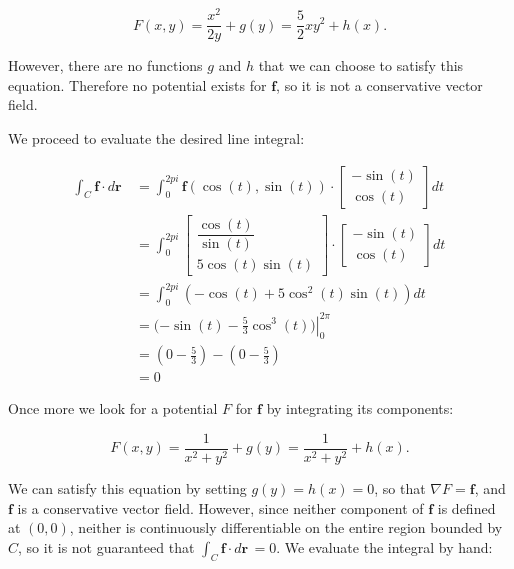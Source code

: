 \begin{equation*}F(x,y) = \frac{x^2}{2y} + g(y) = \frac{5}{2}xy^2 + h(x). \end{equation*}

However, there are no functions $g$ and $h$ that we can choose to satisfy this
equation.  Therefore no potential exists for $\mathbf{f}$, so it is not a
conservative vector field.

We proceed to evaluate the desired line integral:

\begin{align*}
 \int_C \! \mathbf{f} \cdot d\mathbf{r} \,
 &= \int_{0}^{2pi} \! \mathbf{f}(\cos(t), \sin(t)) \cdot \begin{bmatrix} -\sin(t) \\ \cos(t) \end{bmatrix} dt \, \\
 &= \int_{0}^{2pi} \! \begin{bmatrix} \dfrac{\cos(t)}{\sin(t)} \\ 5\cos(t)\sin(t) \end{bmatrix} \cdot \begin{bmatrix} -\sin(t) \\ \cos(t) \end{bmatrix} dt \, \\
 &= \int_{0}^{2pi} \! (-\cos(t) + 5\cos^2(t)\sin(t)) dt \, \\
 &= (\left. -\sin(t) - \frac{5}{3} \cos^3(t)) \right|_{0}^{2\pi} \\
 &= (0 - \frac{5}{3}) - (0 - \frac{5}{3}) \\
 &= 0
\end{align*}

\item
Once more we look for a potential $F$ for $\mathbf{f}$ by integrating its
components:

\begin{equation*} F(x,y) = \dfrac{1}{x^2+y^2} + g(y) = \dfrac{1}{x^2+y^2} + h(x).\end{equation*}

We can satisfy this equation by setting $g(y) = h(x) = 0$, so that $\nabla F =
\mathbf{f}$, and $\mathbf{f}$ is a conservative vector field.  However, since
neither component of $\mathbf{f}$ is defined at $(0,0)$, neither is
continuously differentiable on the entire region bounded by $C$, so it is not
guaranteed that $\int_C \! \mathbf{f} \cdot d\mathbf{r} \, = 0$.  We evaluate
the integral by hand:

